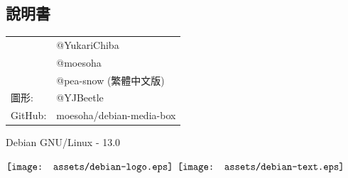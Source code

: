 \documentclass{article}
\begin{document}
\begin{multicols*}{3}



	\begin{tcolorbox}
	\section*{說明書}
	\end{tcolorbox}
	\begin{tabularx}{\linewidth}{@{}ll@{}}
		\multirow{2}{*}{}{編審：} & @YukariChiba\\
		~ & @moesoha \\
		~ & @pea-snow (繁體中文版)\\
		圖形: & @YJBeetle\\
		GitHub: & moesoha/debian-media-box\\
	\end{tabularx}

	\medskip


	\vfill
	\begin{flushright}
		Debian GNU/Linux - 13.0
		\linebreak
		\newline
		\begin{minipage}{0,5\textwidth}
			\centering
			$\vcenter{\hbox{\texttt{[image: assets/debian-logo.eps]}}}$
			$\vcenter{\hbox{\texttt{[image: assets/debian-text.eps]}}}$
		\end{minipage}
	\end{flushright}

\end{multicols*}
\end{document}
